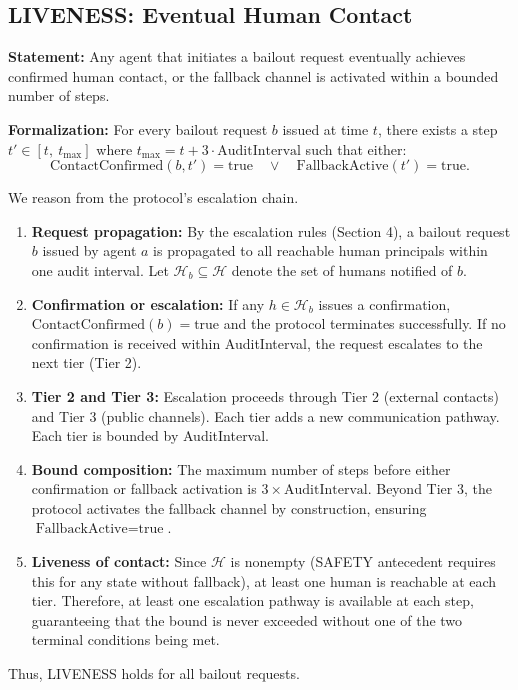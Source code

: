 \subsection{LIVENESS: Eventual Human Contact}

\begin{block}
\textbf{Statement:} Any agent that initiates a bailout request eventually achieves confirmed human contact, or the fallback channel is activated within a bounded number of steps.

\textbf{Formalization:} For every bailout request $b$ issued at time $t$, there exists a step $t' \in [t,\ t_{\max}]$ where $t_{\max} = t + 3 \cdot \text{AuditInterval}$ such that either:
\[
\text{ContactConfirmed}(b, t') = \text{true} \quad \lor \quad \text{FallbackActive}(t') = \text{true}.
\]
\end{block}

\begin{block}
We reason from the protocol's escalation chain.

\begin{enumerate}
\item \textbf{Request propagation:} By the escalation rules (Section 4), a bailout request $b$ issued by agent $a$ is propagated to all reachable human principals within one audit interval. Let $\mathcal{H}_b \subseteq \mathcal{H}$ denote the set of humans notified of $b$.

\item \textbf{Confirmation or escalation:} If any $h \in \mathcal{H}_b$ issues a confirmation, $\text{ContactConfirmed}(b) = \text{true}$ and the protocol terminates successfully. If no confirmation is received within AuditInterval, the request escalates to the next tier (Tier 2).

\item \textbf{Tier 2 and Tier 3:} Escalation proceeds through Tier 2 (external contacts) and Tier 3 (public channels). Each tier adds a new communication pathway. Each tier is bounded by AuditInterval.

\item \textbf{Bound composition:} The maximum number of steps before either confirmation or fallback activation is $3 \times \text{AuditInterval}$. Beyond Tier 3, the protocol activates the fallback channel by construction, ensuring $\text{FallbackActive} = \text{true}$.

\item \textbf{Liveness of contact:} Since $\mathcal{H}$ is nonempty (SAFETY antecedent requires this for any state without fallback), at least one human is reachable at each tier. Therefore, at least one escalation pathway is available at each step, guaranteeing that the bound is never exceeded without one of the two terminal conditions being met.
\end{enumerate}

Thus, LIVENESS holds for all bailout requests.
\end{block}

